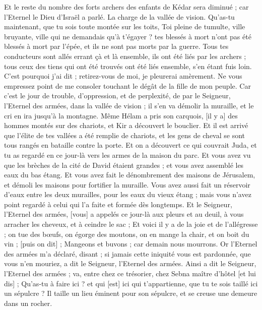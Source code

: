 \begin{multicols}{2}
Et le reste du nombre des forts archers des enfants de Kédar sera diminué ; car l'Eternel le Dieu d'Israël a parlé.
\VerseOne{}La charge de la vallée de vision. Qu'as-tu maintenant, que tu sois toute montée sur les toits,
Toi pleine de tumulte, ville bruyante, ville qui ne demandais qu'à t'égayer ? tes blessés à mort n'ont pas été blessés à mort par l'épée, et ils ne sont pas morts par la guerre.
Tous tes conducteurs sont allés errant çà et là ensemble, ils ont été liés par les archers ; tous ceux des tiens qui ont été trouvés ont été liés ensemble, s'en étant fuis loin.
C'est pourquoi j'ai dit ; retirez-vous de moi, je pleurerai amèrement. Ne vous empressez point de me consoler touchant le dégât de la fille de mon peuple.
Car c'est le jour de trouble, d'oppression, et de perplexité, de par le Seigneur, l'Eternel des armées, dans la vallée de vision ; il s'en va démolir la muraille, et le cri en ira jusqu'à la montagne.
Même Hélam a pris son carquois, [il y a] des hommes montés sur des chariots, et Kir a découvert le bouclier.
Et il est arrivé que l'élite de tes vallées a été remplie de chariots, et les gens de cheval se sont tous rangés en bataille contre la porte.
Et on a découvert ce qui couvrait Juda, et tu as regardé en ce jour-là vers les armes de la maison du parc.
Et vous avez vu que les brèches de la cité de David étaient grandes ; et vous avez assemblé les eaux du bas étang.
Et vous avez fait le dénombrement des maisons de Jérusalem, et démoli les maisons pour fortifier la muraille.
Vous avez aussi fait un réservoir d'eaux entre les deux murailles, pour les eaux du vieux étang ; mais vous n'avez point regardé à celui qui l'a faite et formée dès longtemps.
Et le Seigneur, l'Eternel des armées, [vous] a appelés ce jour-là aux pleurs et au deuil, à vous arracher les cheveux, et à ceindre le sac ;
Et voici il y a de la joie et de l'allégresse ; on tue des bœufs, on égorge des moutons, on en mange la chair, et on boit du vin ; [puis on dit] ; Mangeons et buvons ; car demain nous mourrons.
Or l'Eternel des armées m'a déclaré, disant ; si jamais cette iniquité vous est pardonnée, que vous n'en mouriez, a dit le Seigneur, l'Eternel des armées.
Ainsi a dit le Seigneur, l'Eternel des armées ; va, entre chez ce trésorier, chez Sebna maître d'hôtel [et lui dis] ;
Qu'as-tu à faire ici ? et qui [est] ici qui t'appartienne, que tu te sois taillé ici un sépulcre ? Il taille un lieu éminent pour son sépulcre, et se creuse une demeure dans un rocher.

\end{multicols}
